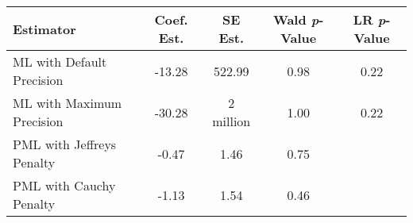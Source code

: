 
\begin{tabular}{lcccc}
\toprule
\textbf{Estimator} & \textbf{Coef. Est.} & \textbf{SE Est.} & \textbf{Wald \textit{p}-Value} & \textbf{LR \textit{p}-Value}\\
\midrule
ML with Default Precision & -13.28 & 522.99 & 0.98 & 0.22\\
ML with Maximum Precision & -30.28 & 2 million & 1.00 & 0.22\\
PML with Jeffreys Penalty & -0.47 & 1.46 & 0.75 & \\
PML with Cauchy Penalty & -1.13 & 1.54 & 0.46 & \\
\bottomrule
\end{tabular}